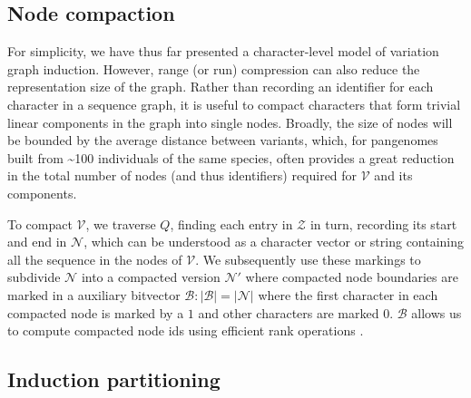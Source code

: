 \documentclass{bioinfo}
\theoremstyle{definition}
\newcommand{\red}[1]{{\textcolor{Red}{#1}}}
\newcommand{\FIXME}[1]{\red{[FIXME: #1]}}
\begin{document}





\subsection{Node compaction}

For simplicity, we have thus far presented a character-level model of variation graph induction.
However, range (or run) compression can also reduce the representation size of the graph.
Rather than recording an identifier for each character in a sequence graph, it is useful to compact characters that form trivial linear components in the graph into single nodes.
Broadly, the size of nodes will be bounded by the average distance between variants, which, for pangenomes built from \textasciitilde100 individuals of the same species, often provides a great reduction in the total number of nodes (and thus identifiers) required for $\mathcal{V}$ and its components.

To compact $\mathcal{V}$, we traverse $Q$, finding each entry in $\mathcal{Z}$ in turn, recording its start and end in $\mathcal{N}$, which can be understood as a character vector or string containing all the sequence in the nodes of $\mathcal{V}$.
We subsequently use these markings to subdivide $\mathcal{N}$ into a compacted version $\mathcal{N}'$ where compacted node boundaries are marked in a auxiliary bitvector $\mathcal{B} : |\mathcal{B}| = |\mathcal{N}|$ where the first character in each compacted node is marked by a $1$ and other characters are marked $0$.
$\mathcal{B}$ allows us to compute compacted node ids using efficient rank operations \citep{Gog_2014}.


\subsection{Induction partitioning}
\label{sec:partitioning}
\end{document}
